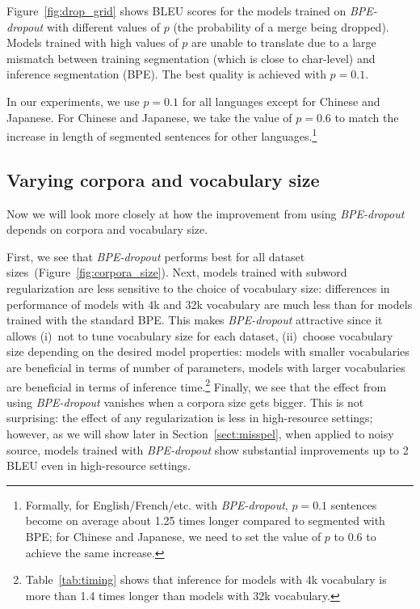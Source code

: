 \documentclass[11pt,a4paper]{article}
\begin{document}
Figure~\ref{fig:drop_grid} shows BLEU scores for the models trained on \textit{BPE-dropout} with different values of $ p $ (the probability of a merge being dropped). 
Models trained with high values of $p$ are unable to translate due to a large mismatch between training segmentation (which is close to char-level) and inference segmentation (BPE). The best quality is achieved with $p = 0{.}1$. 

In our experiments, we use $p = 0{.}1$ for all languages except for Chinese and Japanese.
For Chinese and Japanese, we take the value of $p=0.6$ to match the increase in length of segmented sentences for other languages.\footnote{Formally, for English/French/etc. with \textit{BPE-dropout}, $p = 0.1$ sentences become on average about 1.25 times longer compared to segmented with BPE; for Chinese and Japanese, we need to set the value of $p$ to $0{.}6$ to achieve the same increase.}


\subsection{Varying corpora and vocabulary size}


Now we will look more closely at how the improvement from using \textit{BPE-dropout} depends on corpora and vocabulary size. 

First, we see that \textit{BPE-dropout} performs best for all dataset sizes~(Figure~\ref{fig:corpora_size}). Next, models trained with subword regularization are less sensitive to the choice of vocabulary size: differences in performance of models with 4k and 32k vocabulary are much less than for models trained with the standard BPE. This makes \textit{BPE-dropout} attractive since it allows (i)~not to tune vocabulary size for each dataset, (ii)~choose vocabulary size depending on the desired model properties: models with smaller vocabularies are beneficial in terms of number of parameters, models with larger vocabularies are beneficial in terms of inference time.\footnote{Table~\ref{tab:timing} shows that inference for models with 4k vocabulary is more than 1{.}4 times longer than models with 32k vocabulary.} Finally, we see that the effect from using \textit{BPE-dropout}  vanishes when a corpora size gets bigger. This is not surprising: the effect of any regularization is less in high-resource settings; however, as we will show later in Section~\ref{sect:misspel}, when applied to noisy source, models trained with \textit{BPE-dropout} show substantial improvements up to 2 BLEU even in high-resource settings. 
\end{document}
